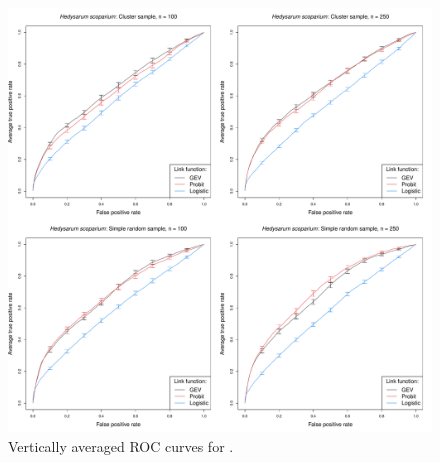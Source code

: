\documentclass[12pt]{article}
\begin{document}
\begin{figure}
	\includegraphics[width=\linewidth]{plots/data-perf-species2}
	\caption{Vertically averaged ROC curves for \hedysarum{}.}
	\label{rbfig:data2roc}
\end{figure}
\end{document}
